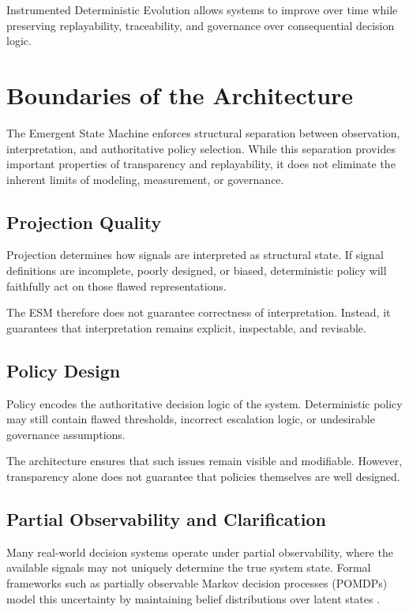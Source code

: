 \documentclass[11pt]{article}
\begin{document}
Instrumented Deterministic Evolution allows systems to improve over time while preserving replayability, traceability, and governance over consequential decision logic.





\section{Boundaries of the Architecture}

The Emergent State Machine enforces structural separation between observation, interpretation, and authoritative policy selection. While this separation provides important properties of transparency and replayability, it does not eliminate the inherent limits of modeling, measurement, or governance.

\subsection{Projection Quality}

Projection determines how signals are interpreted as structural state. If signal definitions are incomplete, poorly designed, or biased, deterministic policy will faithfully act on those flawed representations.

The ESM therefore does not guarantee correctness of interpretation. Instead, it guarantees that interpretation remains explicit, inspectable, and revisable.

\subsection{Policy Design}

Policy encodes the authoritative decision logic of the system. Deterministic policy may still contain flawed thresholds, incorrect escalation logic, or undesirable governance assumptions.

The architecture ensures that such issues remain visible and modifiable. However, transparency alone does not guarantee that policies themselves are well designed.

\subsection{Partial Observability and Clarification}

Many real-world decision systems operate under partial observability, where the available signals may not uniquely determine the true system state. Formal frameworks such as partially observable Markov decision processes (POMDPs) model this uncertainty by maintaining belief distributions over latent states \citep{kaelbling1998}.
\end{document}
